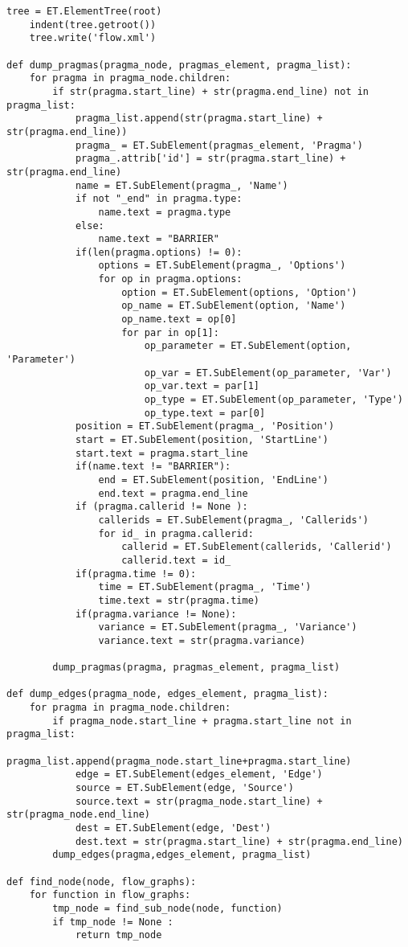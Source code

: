 \documentclass[a4paper,10pt,twoside]{book}
\begin{document}
\begin{lstlisting}[language=CCC, caption=pargraph.py]
	tree = ET.ElementTree(root)
	indent(tree.getroot())
	tree.write('flow.xml')

def dump_pragmas(pragma_node, pragmas_element, pragma_list):
	for pragma in pragma_node.children:
		if str(pragma.start_line) + str(pragma.end_line) not in pragma_list:
			pragma_list.append(str(pragma.start_line) + str(pragma.end_line))
			pragma_ = ET.SubElement(pragmas_element, 'Pragma')
			pragma_.attrib['id'] = str(pragma.start_line) + str(pragma.end_line)
			name = ET.SubElement(pragma_, 'Name')
			if not "_end" in pragma.type:
				name.text = pragma.type
			else:
				name.text = "BARRIER"
			if(len(pragma.options) != 0):
				options = ET.SubElement(pragma_, 'Options')
				for op in pragma.options:
					option = ET.SubElement(options, 'Option')
					op_name = ET.SubElement(option, 'Name')
					op_name.text = op[0]
					for par in op[1]:
						op_parameter = ET.SubElement(option, 'Parameter')
						op_var = ET.SubElement(op_parameter, 'Var')
						op_var.text = par[1]
						op_type = ET.SubElement(op_parameter, 'Type')
						op_type.text = par[0]
			position = ET.SubElement(pragma_, 'Position')
			start = ET.SubElement(position, 'StartLine')
			start.text = pragma.start_line
			if(name.text != "BARRIER"):
				end = ET.SubElement(position, 'EndLine')
				end.text = pragma.end_line
			if (pragma.callerid != None ):
				callerids = ET.SubElement(pragma_, 'Callerids')
				for id_ in pragma.callerid:
					callerid = ET.SubElement(callerids, 'Callerid')
					callerid.text = id_
			if(pragma.time != 0):
				time = ET.SubElement(pragma_, 'Time')
				time.text = str(pragma.time)
			if(pragma.variance != None):
				variance = ET.SubElement(pragma_, 'Variance')
				variance.text = str(pragma.variance)

		dump_pragmas(pragma, pragmas_element, pragma_list)

def dump_edges(pragma_node, edges_element, pragma_list):
	for pragma in pragma_node.children:
		if pragma_node.start_line + pragma.start_line not in pragma_list:
			pragma_list.append(pragma_node.start_line+pragma.start_line)
			edge = ET.SubElement(edges_element, 'Edge')
			source = ET.SubElement(edge, 'Source')
			source.text = str(pragma_node.start_line) + str(pragma_node.end_line)
			dest = ET.SubElement(edge, 'Dest')
			dest.text = str(pragma.start_line) + str(pragma.end_line)
		dump_edges(pragma,edges_element, pragma_list)

def find_node(node, flow_graphs):
	for function in flow_graphs:
		tmp_node = find_sub_node(node, function) 
		if tmp_node != None :
			return tmp_node


\end{lstlisting}
\end{document}
